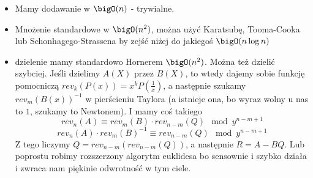 \begin{itemize}
    \item Mamy dodawanie w $\bigO(n)$ - trywialne.
    \item Mnożenie standardowe w $\bigO(n^2)$, można użyć Karatsubę, Tooma-Cooka lub Schonhagego-Strassena by zejść niżej do jakiegoś $\bigO(n\log n)$
    \item dzielenie mamy standardowo Hornerem $\bigO(n^2)$. Można też dzielić szybciej. Jeśli dzielimy $A(X)$ przez $B(X)$, to wtedy dajemy sobie funkcję pomocniczą $rev_k(P(x))=x^kP(\frac{1}{x})$, a następnie szukamy $rev_m(B(x))^{-1}$ w pierścieniu Taylora (a istnieje ona, bo wyraz wolny u nas to $1$, szukamy to Newtonem). I mamy coś takiego 
    $$rev_n(A)\equiv rev_m(B)\cdot rev_{n-m}(Q) \mod y^{n-m+1}$$
    $$rev_n(A)\cdot rev_m(B)^{-1}\equiv rev_{n-m}(Q) \mod y^{n-m+1}$$
    Z tego liczymy $Q=rev_{n-m}(rev_{n-m}(Q))$, a następnie $R=A-BQ$. Lub poprostu robimy rozszerzony algorytm euklidesa bo sensownie i szybko działa i zwraca nam piękinie odwrotność w tym ciele.
\end{itemize}
